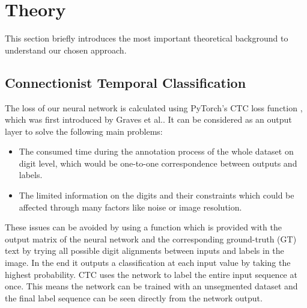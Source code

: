 \section{Theory}\label{sec:theory}
This section briefly introduces the most important theoretical background to understand our chosen approach.
\subsection{Connectionist Temporal Classification}\label{subsec:ctc}

The loss of our neural network is calculated using PyTorch's CTC loss function \cite{pytorch_ctc},
which was first introduced by Graves et al.\cite{CTC}. It can be considered as
an output layer to solve the following main problems:
\begin{itemize}
\item The consumed time during the annotation process of the whole dataset on
digit level, which would be one-to-one correspondence between outputs and
labels.
\item The limited information on the digits and their
constraints which could be affected through many factors like noise or image resolution.
\end{itemize}
These issues can be avoided by using a function which is provided with the
output matrix of the neural network and the corresponding ground-truth (GT) text
by trying all possible digit alignments between inputs and labels in the image.
In the end it outputs a classification at each input value by taking the highest
probability. CTC uses the network to label the entire input sequence at once.
This means the network can be trained with an unsegmented dataset and the final
label sequence can be seen directly from the network output. 

